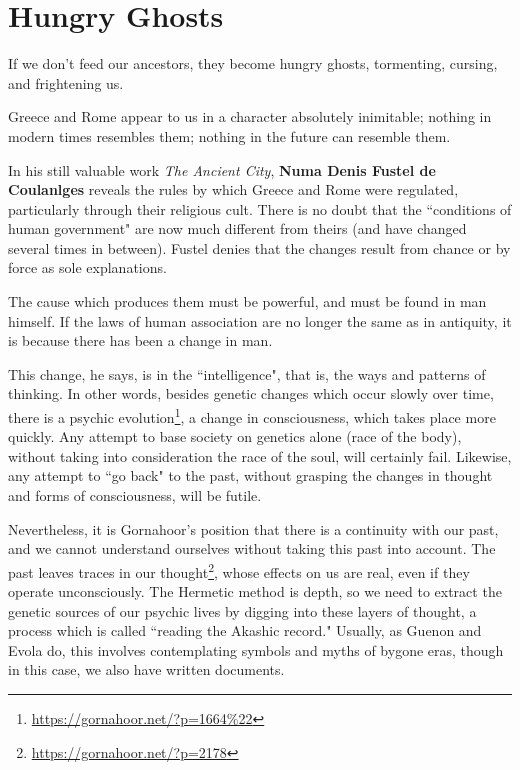 \section{Hungry Ghosts}

If we don't feed our ancestors, they become hungry ghosts, tormenting, cursing, and frightening us.

\begin{quotex}
Greece and Rome appear to us in a character absolutely inimitable; nothing in modern times resembles them; nothing in the future can resemble them. 

\end{quotex}
In his still valuable work \textit{The Ancient City}, \textbf{Numa Denis Fustel de Coulanlges} reveals the rules by which Greece and Rome were regulated, particularly through their religious cult. There is no doubt that the ``conditions of human government" are now much different from theirs (and have changed several times in between). Fustel denies that the changes result from chance or by force as sole explanations.

\begin{quotex}
The cause which produces them must be powerful, and must be found in man himself. If the laws of human association are no longer the same as in antiquity, it is because there has been a change in man.

\end{quotex}
This change, he says, is in the ``intelligence", that is, the ways and patterns of thinking. In other words, besides genetic changes which occur slowly over time, there is a psychic evolution\footnote{\url{https://gornahoor.net/?p=1664\%22}}, a change in consciousness, which takes place more quickly. Any attempt to base society on genetics alone (race of the body), without taking into consideration the race of the soul, will certainly fail. Likewise, any attempt to ``go back" to the past, without grasping the changes in thought and forms of consciousness, will be futile.

Nevertheless, it is Gornahoor's position that there is a continuity with our past, and we cannot understand ourselves without taking this past into account. The past leaves traces in our thought\footnote{\url{https://gornahoor.net/?p=2178}}, whose effects on us are real, even if they operate unconsciously. The Hermetic method is depth, so we need to extract the genetic sources of our psychic lives by digging into these layers of thought, a process which is called ``reading the Akashic record." Usually, as Guenon and Evola do, this involves contemplating symbols and myths of bygone eras, though in this case, we also have written documents.

